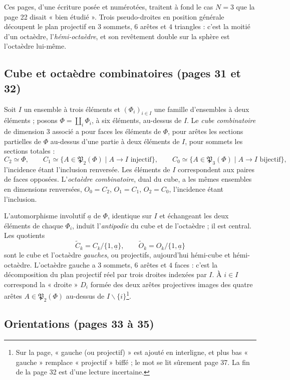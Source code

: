 \documentclass[11pt,a4paper]{article}
\begin{document}
Ces pages, d'une écriture posée et numérotées, traitent à fond le cas $N = 3$
que la page 22 disait « bien étudié ». Trois pseudo-droites en position
générale découpent le plan projectif en $3$ sommets, $6$ arêtes et $4$
triangles : c'est la moitié d'un octaèdre, l'\emph{hémi-octaèdre}, et son
revêtement double sur la sphère est l'octaèdre lui-même.

\subsection*{Cube et octaèdre combinatoires (pages 31 et 32)}

Soit $I$ un ensemble à trois éléments et $(\Phi_i)_{i \in I}$ une famille
d'ensembles à deux éléments ; posons $\Phi = \coprod_i \Phi_i$, à six
éléments, au-dessus de $I$. Le \emph{cube combinatoire} de dimension $3$
associé a pour faces les éléments de $\Phi$, pour arêtes les sections
partielles de $\Phi$ au-dessus d'une partie à deux éléments de $I$, pour
sommets les sections totales :
\[
C_2 \simeq \Phi, \qquad C_1 \simeq \{A \in \mathfrak{P}_2(\Phi) \mid A \to I
\text{ injectif}\}, \qquad C_0 \simeq \{A \in \mathfrak{P}_3(\Phi) \mid A \to I
\text{ bijectif}\},
\]
l'incidence étant l'inclusion renversée. Les éléments de $I$ correspondent
aux paires de faces opposées. L'\emph{octaèdre combinatoire}, dual du cube,
a les mêmes ensembles en dimensions renversées, $O_0 = C_2$, $O_1 = C_1$,
$O_2 = C_0$, l'incidence étant l'inclusion.

L'automorphisme involutif $\underline{a}$ de $\Phi$, identique sur $I$ et
échangeant les deux éléments de chaque $\Phi_i$, induit l'\emph{antipodie}
du cube et de l'octaèdre ; il est central. Les quotients
\[
\widetilde{C}_k = C_k/\{1, \underline{a}\}, \qquad
\widetilde{O}_k = O_k/\{1, \underline{a}\}
\]
sont le cube et l'octaèdre \emph{gauches}, ou projectifs, aujourd'hui
hémi-cube et hémi-octaèdre. L'octaèdre gauche a $3$ sommets, $6$ arêtes et
$4$ faces : c'est la décomposition du plan projectif réel par trois droites
indexées par $I$. À $i \in I$ correspond la « droite » $D_i$ formée des deux
arêtes projectives images des quatre arêtes $A \in \mathfrak{P}_2(\Phi)$
au-dessus de $I \smallsetminus \{i\}$\footnote{Sur la page, « gauche (ou
projectif) » est ajouté en interligne, et plus bas « gauche » remplace
« projectif » biffé ; le mot se lit sûrement page 37. La fin de la page 32 est
d'une lecture incertaine.}.

\subsection*{Orientations (pages 33 à 35)}
\end{document}
